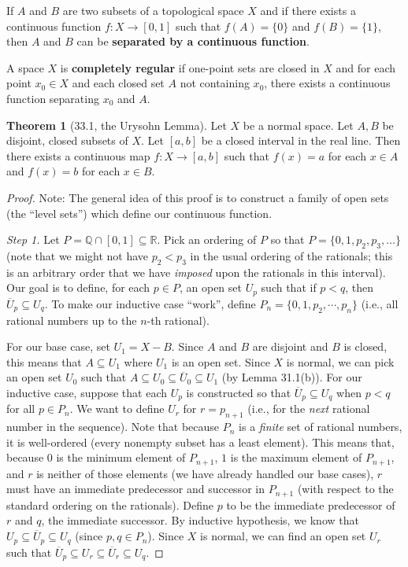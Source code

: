 \documentclass{article}
\newcommand{\nline}{\vspace*{0.5\baselineskip}}
\theoremstyle{definition}
\newtheorem{theorem}{Theorem}[subsection]
\begin{document}
\begin{flushleft}
If $A$ and $B$ are two subsets of a topological space $X$ and if there exists a continuous function $f: X \to [0,1]$ such that $f(A) = \{0\}$ and $f(B) = \{1\}$, then $A$ and $B$ can be \textbf{separated by a continuous function}.

\nline

A space $X$ is \textbf{completely regular} if one-point sets are closed in $X$ and for each point $x_0 \in X$ and each closed set $A$ not containing $x_0$, there exists a continuous function separating $x_0$ and $A$.

\begin{theorem}[33.1, the Urysohn Lemma]
Let $X$ be a normal space. Let $A, B$ be disjoint, closed subsets of $X$. Let $[a,b]$ be a closed interval in the real line. Then there exists a continuous map $f: X \to [a,b]$ such that $f(x) = a$ for each $x \in A$ and $f(x) = b$ for each $x \in B$.
\end{theorem}

\begin{proof}
Note: The general idea of this proof is to construct a family of open sets (the ``level sets'') which define our continuous function.

\nline

\textit{Step 1.} Let $P = \mathbb{Q} \cap [0,1] \subseteq \mathbb{R}$. Pick an ordering of $P$ so that $P = \{0, 1, p_2, p_3, \dots\}$ (note that we might not have $p_2 < p_3$ in the usual ordering of the rationals; this is an arbitrary order that we have \textit{imposed} upon the rationals in this interval). Our goal is to define, for each $p \in P$, an open set $U_p$ such that if $p < q$, then $\overline{U}_p \subseteq U_q$. To make our inductive case ``work'', define $P_n = \{0, 1, p_2, \cdots, p_n\}$ (i.e., all rational numbers up to the $n$-th rational).

\nline

For our base case, set $U_1 = X - B$. Since $A$ and $B$ are disjoint and $B$ is closed, this means that $A \subseteq U_1$ where $U_1$ is an open set. Since $X$ is normal, we can pick an open set $U_0$ such that $A \subseteq U_0 \subseteq \overline{U}_0 \subseteq U_1$ (by Lemma 31.1(b)). For our inductive case, suppose that each $U_p$ is constructed so that $\overline{U}_p \subseteq U_q$ when $p < q$ for all $p \in P_n$. We want to define $U_r$ for $r = p_{n+1}$ (i.e., for the \textit{next} rational number in the sequence). Note that because $P_n$ is a \textit{finite} set of rational numbers, it is well-ordered (every nonempty subset has a least element). This means that, because $0$ is the minimum element of $P_{n+1}$, $1$ is the maximum element of $P_{n+1}$, and $r$ is neither of those elements (we have already handled our base cases), $r$ must have an immediate predecessor and successor in $P_{n+1}$ (with respect to the standard ordering on the rationals). Define $p$ to be the immediate predecessor of $r$ and $q$, the immediate successor. By inductive hypothesis, we know that $U_p \subseteq \overline{U}_p \subseteq U_q$ (since $p, q \in P_n$). Since $X$ is normal, we can find an open set $U_r$ such that $\overline{U}_p \subseteq U_r \subseteq \overline{U}_r \subseteq U_q$.


\end{proof}
\end{flushleft}
\end{document}
